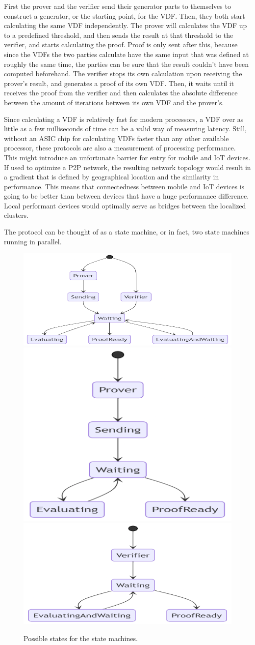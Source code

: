 First the prover and the verifier send their generator parts to themselves to construct a generator, or the starting point, for the VDF. Then, they both start calculating the same VDF independently. The prover will calculates the VDF up to a predefined threshold, and then sends the result at that threshold to the verifier, and starts calculating the proof. Proof is only sent after this, because since the VDFs the two parties calculate have the same input that was defined at roughly the same time, the parties can be sure that the result couldn't have been computed beforehand. The verifier stops its own calculation upon receiving the prover's result, and generates a proof of its own VDF. Then, it waits until it receives the proof from the verifier and then calculates the absolute difference between the amount of iterations between its own VDF and the prover's.

Since calculating a VDF is relatively fast for modern processors, a VDF over as little as a few milliseconds of time can be a valid way of measuring latency. Still, without an ASIC chip for calculating VDFs faster than any other available processor, these protocols are also a measurement of processing performance. This might introduce an unfortunate barrier for entry for mobile and IoT devices. If used to optimize a P2P network, the resulting network topology would result in a gradient that is defined by geographical location and the similarity in performance. This means that connectedness between mobile and IoT devices is going to be better than between devices that have a huge performance difference. Local performant devices would optimally serve as bridges between the localized clusters.

The protocol can be thought of as a state machine, or in fact, two state machines running in parallel.

\begin{figure}[htp]

	\centering
	\includegraphics[width=.3\textwidth]{pictures/mermaid-diagram-20210505012010.png}\hfill
	\includegraphics[width=.3\textwidth]{pictures/mermaid-diagram-20210505014229.png}\hfill
	\includegraphics[width=.3\textwidth]{pictures/mermaid-diagram-20210505015712.png}

	\caption{Possible states for the state machines.}
	\label{Protocol States}

\end{figure}

